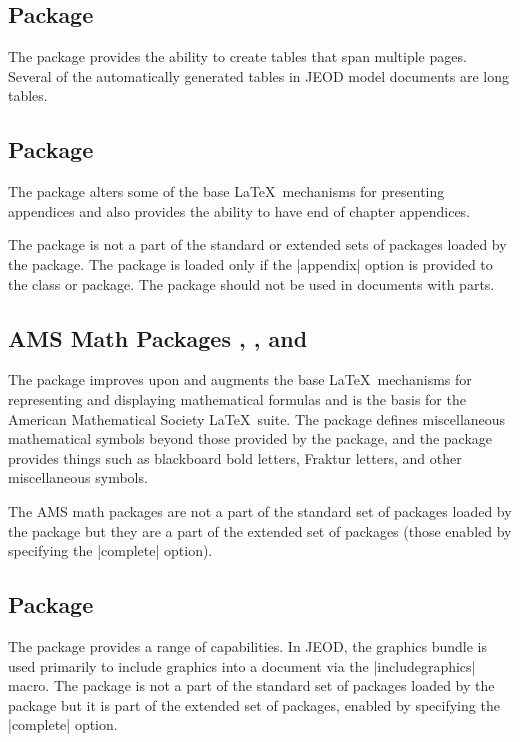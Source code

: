 \subsection{Package }
The  package provides the ability to create tables that
span multiple pages. Several of the automatically generated tables
in JEOD model documents are long tables.

\subsection{Package }
The  package alters some of the base \LaTeX\ mechanisms
for presenting appendices and also provides the ability to have end of chapter
appendices.

The  package is not a part of the standard or extended sets of
packages loaded by the \dynenv package. The package is loaded only if the
|appendix| option is provided to the \dynenv class or package.
The  package should not be used in documents with parts.

\subsection{AMS Math Packages , , and }
The  package improves upon and augments the base
\LaTeX\ mechanisms for representing and displaying mathematical formulas
and is the basis for the American Mathematical Society \LaTeX\ suite.
The  package defines miscellaneous mathematical symbols
beyond those provided by the  package, and the
 package provides things such as
blackboard bold letters, Fraktur letters, and other miscellaneous symbols.

The AMS math packages are not a part of the standard set of packages
loaded by the \dynenv package but they are a part of the extended set
of packages (those enabled by specifying the \dynenv |complete| option).

\subsection{Package }
The  package provides a range of capabilities. In JEOD,
the graphics bundle is used primarily to include graphics into a document
via the |includegraphics| macro.
The  package is not a part of the standard set of packages
loaded by the \dynenv package but it is part of the extended set
of packages, enabled by specifying the \dynenv |complete| option.

